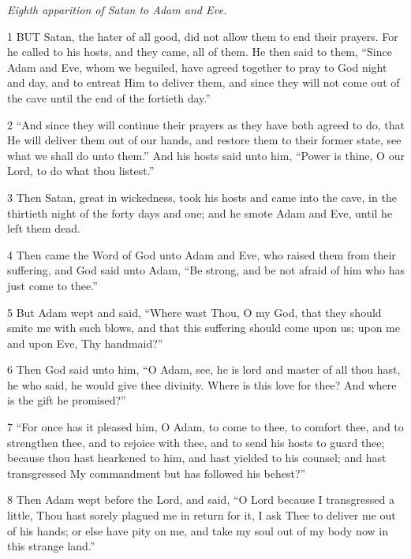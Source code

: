 \par \textit{Eighth apparition of Satan to Adam and Eve.}

\par 1 BUT Satan, the hater of all good, did not allow them to end their prayers. For he called to his hosts, and they came, all of them. He then said to them, “Since Adam and Eve, whom we beguiled, have agreed together to pray to God night and day, and to entreat Him to deliver them, and since they will not come out of the cave until the end of the fortieth day.”

\par 2 “And since they will continue their prayers as they have both agreed to do, that He will deliver them out of our hands, and restore them to their former state, see what we shall do unto them.” And his hosts said unto him, “Power is thine, O our Lord, to do what thou listest.”

\par 3 Then Satan, great in wickedness, took his hosts and came into the cave, in the thirtieth night of the forty days and one; and he smote Adam and Eve, until he left them dead.

\par 4 Then came the Word of God unto Adam and Eve, who raised them from their suffering, and God said unto Adam, “Be strong, and be not afraid of him who has just come to thee.”

\par 5 But Adam wept and said, “Where wast Thou, O my God, that they should smite me with such blows, and that this suffering should come upon us; upon me and upon Eve, Thy handmaid?”

\par 6 Then God said unto him, “O Adam, see, he is lord and master of all thou hast, he who said, he would give thee divinity. Where is this love for thee? And where is the gift he promised?”

\par 7 “For once has it pleased him, O Adam, to come to thee, to comfort thee, and to strengthen thee, and to rejoice with thee, and to send his hosts to guard thee; because thou hast hearkened to him, and hast yielded to his counsel; and hast transgressed My commandment but has followed his behest?”

\par 8 Then Adam wept before the Lord, and said, “O Lord because I transgressed a little, Thou hast sorely plagued me in return for it, I ask Thee to deliver me out of his hands; or else have pity on me, and take my soul out of my body now in this strange land.”

